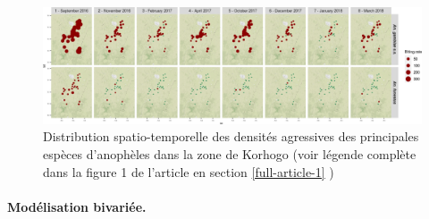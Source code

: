 \documentclass[12pt,twoside]{reedthesis}
\begin{document}
\begin{figure}

{\centering \includegraphics[width=1.1\linewidth]{figure/map_bitingrates_ci} 

}

\caption[Distribution spatio-temporelle des densités agressives des principales espèces d'anophèles dans la zone de Korhogo]{Distribution spatio-temporelle des densités agressives des principales espèces d'anophèles dans la zone de Korhogo (voir légende complète dans la figure 1 de l'article en section \ref{full-article-1} )}\label{fig:map-bitingrates-ci}
\end{figure}
\hypertarget{moduxe9lisation-bivariuxe9e.}{%
\paragraph{Modélisation bivariée.}\label{moduxe9lisation-bivariuxe9e.}}
\end{document}
